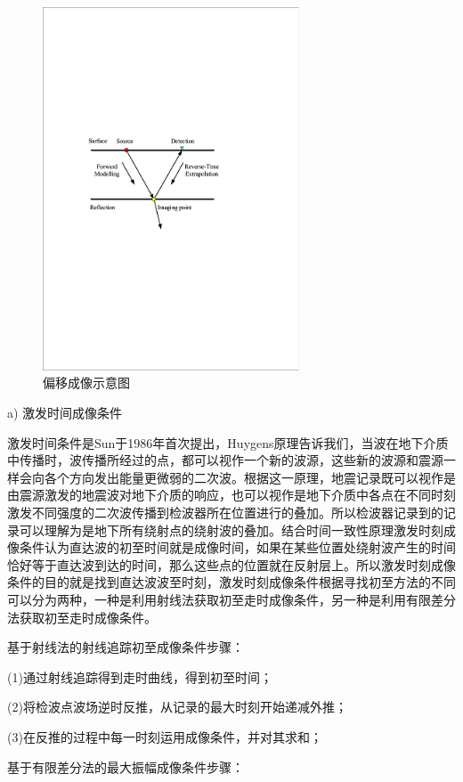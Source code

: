 \documentclass[11pt]{article}
\begin{document}
\par
\begin{figure}[htbp]
\centering
\includegraphics[width=3in]{./FigureFolder/RTM/Migration.pdf}
\caption{偏移成像示意图}
\label{Fig_Migration}
\end{figure}
\par
a) 激发时间成像条件
\par
激发时间条件是Sun于1986年首次提出，Huygens原理告诉我们，当波在地下介质中传播时，波传播所经过的点，都可以视作一个新的波源，这些新的波源和震源一样会向各个方向发出能量更微弱的二次波。根据这一原理，地震记录既可以视作是由震源激发的地震波对地下介质的响应，也可以视作是地下介质中各点在不同时刻激发不同强度的二次波传播到检波器所在位置进行的叠加。所以检波器记录到的记录可以理解为是地下所有绕射点的绕射波的叠加。结合时间一致性原理激发时刻成像条件认为直达波的初至时间就是成像时间，如果在某些位置处绕射波产生的时间恰好等于直达波到达的时间，那么这些点的位置就在反射层上。所以激发时刻成像条件的目的就是找到直达波波至时刻，激发时刻成像条件根据寻找初至方法的不同可以分为两种，一种是利用射线法获取初至走时成像条件，另一种是利用有限差分法获取初至走时成像条件。
\par
基于射线法的射线追踪初至成像条件步骤：
\par
(1)通过射线追踪得到走时曲线，得到初至时间；
\par
(2)将检波点波场逆时反推，从记录的最大时刻开始递减外推；
\par
(3)在反推的过程中每一时刻运用成像条件，并对其求和；
\par
基于有限差分法的最大振幅成像条件步骤：
\par
\end{document}

